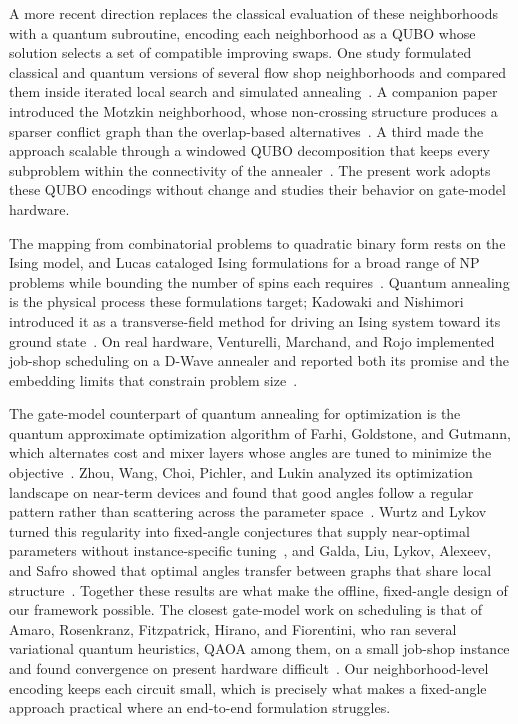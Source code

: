 \documentclass{svproc}
\begin{document}
A more recent direction replaces the classical evaluation of these
neighborhoods with a quantum subroutine, encoding each neighborhood as a
QUBO whose solution selects a set of compatible improving swaps. One
study formulated classical and quantum versions of several flow shop
neighborhoods and compared them inside iterated local search and
simulated annealing~\cite{wojewodzki2026bpasts}. A companion paper
introduced the Motzkin neighborhood, whose non-crossing structure
produces a sparser conflict graph than the overlap-based
alternatives~\cite{wojewodzki2026soco}. A third made the approach
scalable through a windowed QUBO decomposition that keeps every
subproblem within the connectivity of the
annealer~\cite{wojewodzki2026windowed}. The present work adopts these
QUBO encodings without change and studies their behavior on gate-model
hardware.

The mapping from combinatorial problems to quadratic binary form rests on
the Ising model, and Lucas cataloged Ising formulations for a broad
range of NP problems while bounding the number of spins each
requires~\cite{lucas2014ising}. Quantum annealing is the physical process
these formulations target; Kadowaki and Nishimori introduced it as a
transverse-field method for driving an Ising system toward its ground
state~\cite{kadowaki1998}. On real hardware, Venturelli, Marchand, and
Rojo implemented job-shop scheduling on a D-Wave annealer and reported
both its promise and the embedding limits that constrain problem
size~\cite{venturelli2015}.

The gate-model counterpart of quantum annealing for optimization is the
quantum approximate optimization algorithm of Farhi, Goldstone, and
Gutmann, which alternates cost and mixer layers whose angles are tuned to
minimize the objective~\cite{farhi2014qaoa}. Zhou, Wang, Choi, Pichler,
and Lukin analyzed its optimization landscape on near-term devices and
found that good angles follow a regular pattern rather than scattering
across the parameter space~\cite{zhou2020}. Wurtz and Lykov turned this
regularity into fixed-angle conjectures that supply near-optimal
parameters without instance-specific tuning~\cite{wurtz2021fixed}, and
Galda, Liu, Lykov, Alexeev, and Safro showed that optimal angles transfer
between graphs that share local structure~\cite{galda2021}. Together
these results are what make the offline, fixed-angle design of our
framework possible. The closest gate-model work on scheduling is that of
Amaro, Rosenkranz, Fitzpatrick, Hirano, and Fiorentini, who ran several
variational quantum heuristics, QAOA among them, on a small job-shop
instance and found convergence on present hardware difficult~\cite{amaro2022}.
Our neighborhood-level encoding keeps each circuit small, which is
precisely what makes a fixed-angle approach practical where an
end-to-end formulation struggles.
\end{document}

